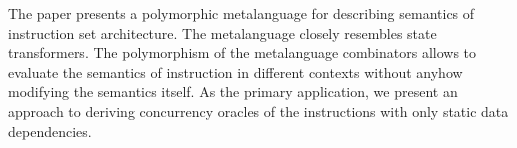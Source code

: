 The paper presents a polymorphic metalanguage for describing semantics of
instruction set architecture. The metalanguage closely resembles state transformers.
The polymorphism of the metalanguage combinators allows to evaluate the semantics
of instruction in different contexts without anyhow modifying the semantics itself.
As the primary application, we present an approach to deriving concurrency oracles
of the instructions with only static data dependencies.